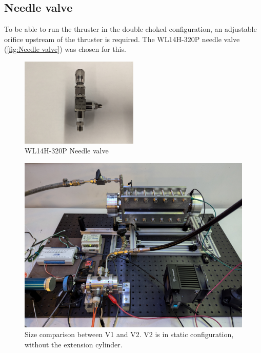         \subsection{Needle valve}
            
            To be able to run the thruster in the double choked configuration, an adjustable orifice upstream of the thruster is required. The WL14H-320P needle valve (\autoref{fig:Needle valve}) was chosen for this.

            \begin{figure}[!ht]
                \centering
                \includegraphics[width=0.50\textwidth]{assets/3 design/Needle valve.jpg}
                \caption{WL14H-320P Needle valve}
                \label{fig:Needle valve}
            \end{figure}

        \begin{figure}[!ht]
            \centering
            \includegraphics[width=\textwidth]{assets/3 design/V1 V2 comparison.png}
            \caption{Size comparison between V1 and V2. V2 is in static configuration, without the extension cylinder.}
        \end{figure} 